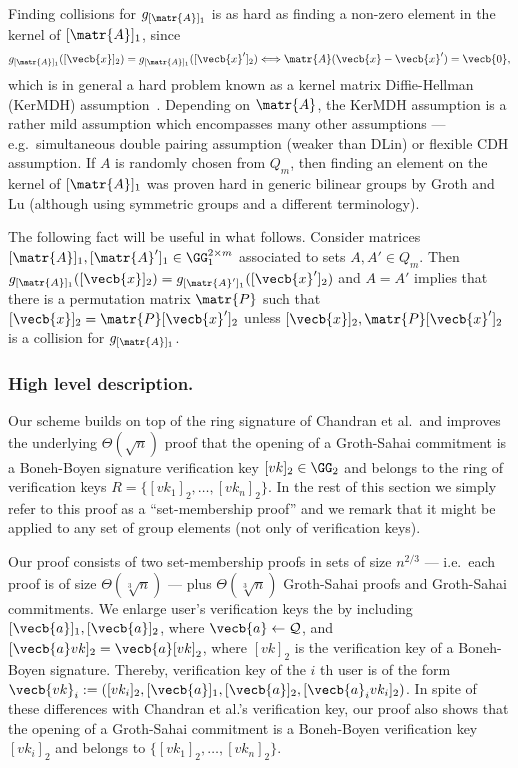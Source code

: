 Finding collisions for $g_{[\matr{A}]_1}$ is as hard as finding a non-zero element in the kernel of $[\matr{A}]_1$, since
$$
g_{[\matr{A}]_1}([\vecb{x}]_2) = g_{[\matr{A}]_1}([\vecb{x}']_2) \Longleftrightarrow \matr{A}(\vecb{x}-\vecb{x}')=\vecb{0},
$$
which is in general a hard problem known as a kernel matrix Diffie-Hellman (KerMDH) assumption~\cite{AC:MorRafVil16}. Depending on $\matr{A}$, the KerMDH assumption is a rather mild assumption which encompasses many other assumptions --- e.g.~simultaneous double pairing assumption (weaker than DLin) or flexible CDH assumption. If $A$ is randomly chosen from $Q_m$, then finding an element on the kernel of $[\matr{A}]_1$ was proven hard in generic bilinear groups by Groth and Lu \cite{AC:GroLu07} (although using symmetric groups and a different terminology).


The following fact will be useful in what follows. Consider matrices $[\matr{A}]_1,[\matr{A}']_1\in\GG^{2\times m}_1$ associated to sets $A,A'\in Q_m$. Then $g_{[\matr{A}]_1}([\vecb{x}]_2) = g_{[\matr{A}']_1}([\vecb{x}']_2)$ and $A=A'$ implies that there is a permutation matrix $\matr{P}$ such that $[\vecb{x}]_2=\matr{P}[\vecb{x}']_2$ unless $[\vecb{x}]_2,\matr{P}[\vecb{x}']_2$ is a collision for $g_{[\matr{A}]_1}$.

\subsubsection{High level description.}
Our scheme builds on top of the ring signature of Chandran et al.~and improves the underlying $\Theta(\sqrt{n})$ proof that the opening of a Groth-Sahai commitment is a Boneh-Boyen signature verification key $[vk]_2\in\GG_2$ and belongs to the ring of verification keys $R=\{[vk_1]_2,\ldots,[vk_n]_2\}$. In the rest of this section we simply refer to this proof as a ``set-membership proof'' and we remark that it might be applied to any set of group elements (not only of verification keys).

Our proof consists of two set-membership proofs in sets of size $n^{2/3}$ --- i.e.~each proof is of size $\Theta(\sqrt[3]{n})$ ---  plus $\Theta(\sqrt[3]{n})$ Groth-Sahai proofs and Groth-Sahai commitments.
We enlarge user's verification keys the by including $[\vecb{a}]_1,[\vecb{a}]_2$, where $\vecb{a}\gets\mathcal{Q}$, and $[\vecb{a}vk]_2=\vecb{a}[vk]_2$, where $[vk]_2$ is the verification key of a Boneh-Boyen signature. Thereby, verification key of the $i$ th user is of the form $\vecb{vk}_i:=([vk_i]_2,[\vecb{a}]_1,[\vecb{a}]_2,[\vecb{a}_ivk_i]_2)$. In spite of these differences with Chandran et al.'s verification key, our proof also shows that the opening of a Groth-Sahai commitment is a Boneh-Boyen verification key $[vk_i]_2$ and belongs to $\{[vk_1]_2,\ldots,[vk_n]_2\}$.

